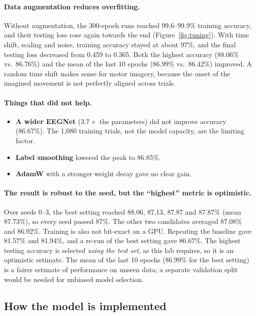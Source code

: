 \documentclass[11pt,a4paper]{article}
\begin{document}
\paragraph{Data augmentation reduces overfitting.}
Without augmentation, the 300-epoch runs reached 99.6--99.9\% training accuracy, and their testing loss rose again towards the end (Figure~\ref{fig:tuning}). With time shift, scaling and noise, training accuracy stayed at about 97\%, and the final testing loss decreased from 0.459 to 0.365. Both the highest accuracy (88.06\% vs.\ 86.76\%) and the mean of the last 10 epochs (86.99\% vs.\ 86.42\%) improved. A random time shift makes sense for motor imagery, because the onset of the imagined movement is not perfectly aligned across trials.

\paragraph{Things that did not help.}
\begin{itemize}
  \item \textbf{A wider EEGNet} ($3.7\times$ the parameters) did not improve accuracy (86.67\%). The 1{,}080 training trials, not the model capacity, are the limiting factor.
  \item \textbf{Label smoothing} lowered the peak to 86.85\%.
  \item \textbf{AdamW} with a stronger weight decay gave no clear gain.
\end{itemize}

\paragraph{The result is robust to the seed, but the ``highest'' metric is optimistic.}
Over seeds 0--3, the best setting reached 88.06, 87.13, 87.87 and 87.87\% (mean 87.73\%), so every seed passed 87\%. The other two candidates averaged 87.08\% and 86.92\%. Training is also not bit-exact on a GPU. Repeating the baseline gave 81.57\% and 81.94\%, and a re-run of the best setting gave 86.67\%. The highest testing accuracy is selected \emph{using the test set}, as this lab requires, so it is an optimistic estimate. The mean of the last 10 epochs (86.99\% for the best setting) is a fairer estimate of performance on unseen data; a separate validation split would be needed for unbiased model selection.

\subsection{How the model is implemented}
\end{document}
